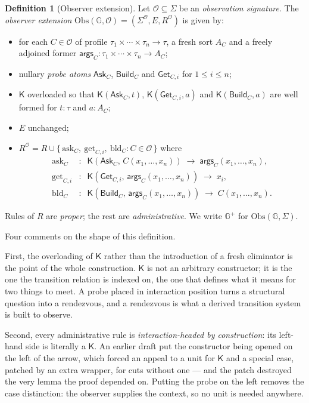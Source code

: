 \documentclass[11pt]{article}
\theoremstyle{plain}
\theoremstyle{definition}
\newtheorem{definition}[theorem]{Definition}
\newcommand{\Kc}{\mathsf{K}}
\newcommand{\Gg}{\mathbb{G}}
\newcommand{\Obs}{\mathrm{Obs}}
\newcommand{\Ask}{\mathsf{Ask}}
\newcommand{\Get}{\mathsf{Get}}
\newcommand{\Bld}{\mathsf{Build}}
\newcommand{\args}{\mathsf{args}}
\newcommand{\Ob}{\mathcal{O}}
\begin{document}
\begin{definition}[Observer extension]
\label{def:ext}
Let $\Ob \subseteq \Sigma$ be an \emph{observation signature}. The \emph{observer extension}
$\Obs(\Gg,\Ob) = (\Sigma^\Ob, E, R^\Ob)$ is given by:
\begin{itemize}
\item for each $C \in \Ob$ of profile $\tau_1 \times \cdots \times \tau_n \to \tau$, a fresh sort
$A_C$ and a freely adjoined former $\args_C : \tau_1 \times \cdots \times \tau_n \to A_C$;
\item nullary \emph{probe atoms} $\Ask_C$, $\Bld_C$ and $\Get_{C,i}$ for $1 \le i \le n$;
\item $\Kc$ overloaded so that $\Kc(\Ask_C, t)$, $\Kc(\Get_{C,i}, a)$ and $\Kc(\Bld_C, a)$ are well
formed for $t : \tau$ and $a : A_C$;
\item $E$ unchanged;
\item $R^\Ob = R \cup \{\, \mathrm{ask}_C,\ \mathrm{get}_{C,i},\ \mathrm{bld}_C : C \in \Ob \,\}$ where
\begin{align*}
\mathrm{ask}_C   &: \;\; \Kc(\Ask_C,\, C(x_1,\dots,x_n)) \;\longrightarrow\; \args_C(x_1,\dots,x_n),\\
\mathrm{get}_{C,i} &: \;\; \Kc(\Get_{C,i},\, \args_C(x_1,\dots,x_n)) \;\longrightarrow\; x_i,\\
\mathrm{bld}_C   &: \;\; \Kc(\Bld_C,\, \args_C(x_1,\dots,x_n)) \;\longrightarrow\; C(x_1,\dots,x_n).
\end{align*}
\end{itemize}
Rules of $R$ are \emph{proper}; the rest are \emph{administrative}. We write $\Gg^+$ for
$\Obs(\Gg,\Sigma)$.
\end{definition}

Four comments on the shape of this definition.

First, the overloading of $\Kc$ rather than the introduction of a fresh eliminator is the point of the
whole construction. $\Kc$ is not an arbitrary constructor; it is the one the transition relation is
indexed on, the one that defines what it means for two things to meet. A probe placed in interaction
position turns a structural question into a rendezvous, and a rendezvous is what a derived transition
system is built to observe.

Second, every administrative rule is \emph{interaction-headed by construction}: its left-hand side is
literally a $\Kc$. An earlier draft put the constructor being opened on the left of the arrow, which
forced an appeal to a unit for $\Kc$ and a special case, patched by an extra wrapper, for cuts without
one --- and the patch destroyed the very lemma the proof depended on. Putting the probe on the left
removes the case distinction: the observer supplies the context, so no unit is needed anywhere.
\end{document}
